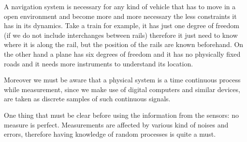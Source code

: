 A navigation system is necessary for any kind of vehicle that has to move in a open environment and become more and more necessary the less constraints it has in its dynamics. Take a train for example, it has just one degree of freedom (if we do not include interchanges between rails) therefore it just need to know where it is along the rail, but the position of the rails are known beforehand. On the other hand a plane has six degrees of freedom and it has no physically fixed roads and it needs more instruments to understand its location. 

Moreover we must be aware that a physical system is a time continuous process while measurement, since we make use of digital computers and similar devices, are taken as discrete samples of such continuous signals. 

One thing that must be clear before using the information from the sensors: no measure is perfect. Measurements are affected by various kind of noises and errors, therefore having knowledge of random processes is quite a must. 
